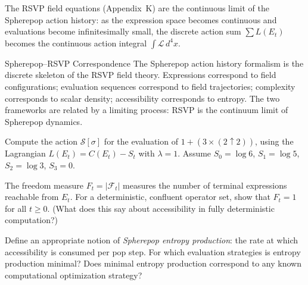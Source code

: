 The RSVP field equations (Appendix~K) are the continuous limit of the
Spherepop action history: as the expression space becomes continuous
and evaluations become infinitesimally small, the discrete action sum
$\sum L(E_t)$ becomes the continuous action integral $\int \mathcal{L}\,d^4x$.

\begin{namedthm}{Spherepop–RSVP Correspondence}
  The Spherepop action history formalism is the discrete skeleton of
  the RSVP field theory. Expressions correspond to field configurations;
  evaluation sequences correspond to field trajectories; complexity
  corresponds to scalar density; accessibility corresponds to entropy.
  The two frameworks are related by a limiting process: RSVP is
  the continuum limit of Spherepop dynamics.
\end{namedthm}

\begin{exercise}
  Compute the action $\mathcal{S}[\sigma]$ for the evaluation
  of $1 + (3 \times (2 \uparrow 2))$, using the Lagrangian
  $L(E_t) = C(E_t) - S_t$ with $\lambda = 1$. Assume $S_0 = \log 6$,
  $S_1 = \log 5$, $S_2 = \log 3$, $S_3 = 0$.
\end{exercise}

\begin{exercise}
  The freedom measure $F_t = |\mathcal{F}_t|$ measures the number of
  terminal expressions reachable from $E_t$. For a deterministic,
  confluent operator set, show that $F_t = 1$ for all $t \geq 0$.
  (What does this say about accessibility in fully deterministic
  computation?)
\end{exercise}

\begin{exercise}[title={Open problem}]
  Define an appropriate notion of \emph{Spherepop entropy production}:
  the rate at which accessibility is consumed per pop step. For which
  evaluation strategies is entropy production minimal? Does minimal
  entropy production correspond to any known computational optimization
  strategy?
\end{exercise}
